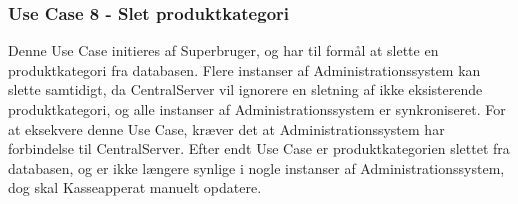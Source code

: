 \subsubsection{Use Case 8 - Slet produktkategori}
Denne Use Case initieres af Superbruger, og har til formål at slette en produktkategori fra databasen. Flere instanser af Administrationssystem kan slette samtidigt, da CentralServer vil ignorere en sletning af ikke eksisterende produktkategori, og alle instanser af Administrationssystem er synkroniseret. For at eksekvere denne Use Case, kræver det at Administrationssystem har forbindelse til CentralServer. Efter endt Use Case er produktkategorien slettet fra databasen, og er ikke længere synlige i nogle instanser af Administrationssystem, dog skal Kasseapperat manuelt opdatere.